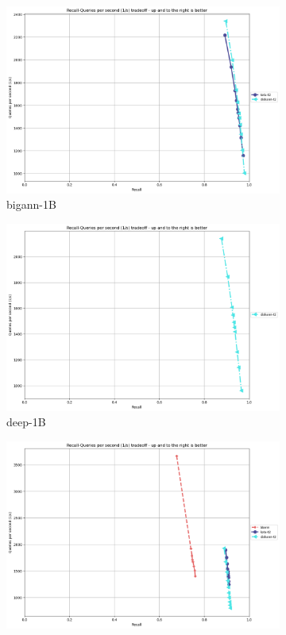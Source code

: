 \begin{figure}[ht]
  \begin{subfigure}{0.48\textwidth}
    \centering
    \includegraphics[width=\linewidth]{../t1_t2/results/T2/neurips21/bigann-1B.png}
      \caption{bigann-1B}
  \end{subfigure}
  \begin{subfigure}{0.48\textwidth}
    \centering
    \includegraphics[width=\linewidth]{../t1_t2/results/T2/neurips21/deep-1B.png}
    \caption{deep-1B}
  \end{subfigure}
  \begin{subfigure}{0.48\textwidth}
    \centering
    \includegraphics[width=\linewidth]{../t1_t2/results/T2/neurips21/msspacev-1B.png}

\end{subfigure}
\end{figure}

